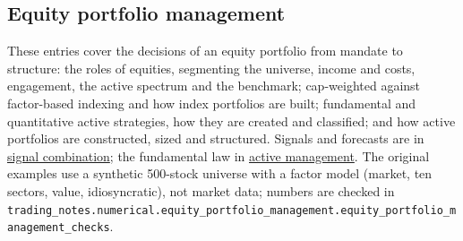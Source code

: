 \subsection{Equity portfolio management}

These entries cover the decisions of an equity portfolio from mandate to structure: the roles of equities, segmenting the universe, income and costs, engagement, the active spectrum and the benchmark; cap-weighted against factor-based indexing and how index portfolios are built; fundamental and quantitative active strategies, how they are created and classified; and how active portfolios are constructed, sized and structured. Signals and forecasts are in \hyperref[meth:alpha-signal-combination]{signal combination}; the fundamental law in \hyperref[res:fundamental-law-active-management]{active management}. The original examples use a synthetic 500-stock universe with a factor model (market, ten sectors, value, idiosyncratic), not market data; numbers are checked in \nolinkurl{trading_notes.numerical.equity_portfolio_management.equity_portfolio_management_checks}.

